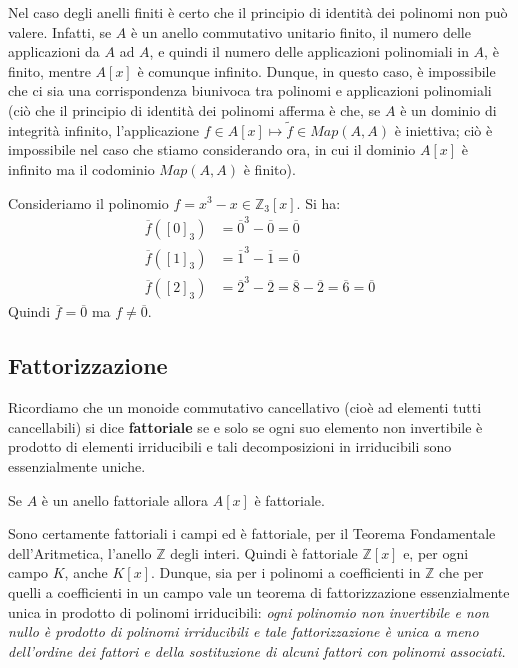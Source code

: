 Nel caso degli anelli finiti è certo che il principio di identità dei polinomi non può valere. Infatti, se $A$ è un anello commutativo unitario finito, il numero delle applicazioni da $A$ ad $A$, e quindi il numero delle applicazioni polinomiali in $A$, è finito, mentre $A[x]$ è comunque infinito. Dunque, in questo caso, è impossibile che ci sia una corrispondenza biunivoca tra polinomi e applicazioni polinomiali (ciò che il principio di identità dei polinomi afferma è che, se $A$ è un dominio di integrità infinito, l’applicazione $f \in A[x] \mapsto  \widetilde{f} \in Map(A, A)$ è iniettiva; ciò è impossibile nel caso che stiamo considerando ora, in cui il dominio $A[x]$ è infinito ma il codominio $Map(A, A)$ è finito).


\begin{example}
	Consideriamo il polinomio $f= x^{3}-x \in \mathbb{Z}_{3}[x]$. Si ha:
	\begin{align*}
		\overline{f}([0]_{3}) &= \overline{0}^{3}-\overline{0} = \overline{0}\\
		\overline{f}([1]_{3}) &= \overline{1}^{3} - \overline{1} = \overline{0}\\
		\overline{f}([2]_{3}) &= \overline{2}^{3} -\overline{2} = \overline{8}-\overline{2}=\overline{6}=\overline{0}
	\end{align*}
	Quindi $\overline{f} = \overline{0}$ ma $f \neq \overline{0}$.
\end{example}

\subsection{Fattorizzazione}

Ricordiamo che un monoide commutativo cancellativo (cioè ad elementi tutti cancellabili) si dice \textbf{fattoriale} se e
solo se ogni suo elemento non invertibile è prodotto di elementi irriducibili e tali decomposizioni in irriducibili
sono essenzialmente uniche.


\begin{teorbox}
	Se $A$ è un anello fattoriale allora $A[x]$ è fattoriale.
\end{teorbox}


Sono certamente fattoriali i campi ed è fattoriale, per il Teorema Fondamentale dell’Aritmetica, l’anello $\mathbb{Z}$ degli interi. Quindi è fattoriale $\mathbb{Z}[x]$ e, per ogni campo $K$, anche $K[x]$. Dunque, sia per i polinomi a coefficienti in $\mathbb{Z}$ che per quelli a coefficienti in un campo vale un teorema di fattorizzazione essenzialmente unica in prodotto di polinomi irriducibili: \textit{ogni polinomio non invertibile e non nullo è prodotto di polinomi irriducibili e tale fattorizzazione è unica a meno dell’ordine dei fattori e della sostituzione di alcuni fattori con polinomi associati.}



